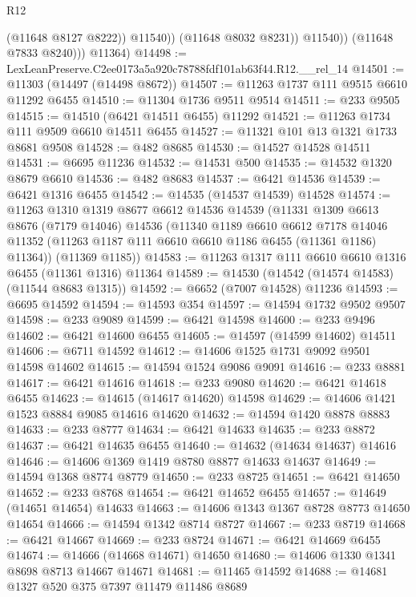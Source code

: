 \begin{lexlean}{R12}
\begin{coremodule}
                      (@11648 @8127 @8222))
                    @11540))
                (@11648 @8032 @8231))
              @11540))
          (@11648 @7833 @8240)))
      @11364)
@14498 := LexLeanPreserve.C2ee0173a5a920c78788fdf101ab63f44.R12.__rel_14
@14501 := @11303 (@14497 (@14498 @8672))
@14507 := @11263 @1737 @111 @9515 @6610 @11292 @6455
@14510 := @11304 @1736 @9511 @9514
@14511 := @233 @9505
@14515 := @14510 (@6421 @14511 @6455) @11292
@14521 := @11263 @1734 @111 @9509 @6610 @14511 @6455
@14527 := @11321 @101 @13 @1321 @1733 @8681 @9508
@14528 := @482 @8685
@14530 := @14527 @14528 @14511
@14531 := @6695 @11236
@14532 := @14531 @500
@14535 := @14532 @1320 @8679 @6610
@14536 := @482 @8683
@14537 := @6421 @14536
@14539 := @6421 @1316 @6455
@14542 := @14535 (@14537 @14539) @14528
@14574 := @11263
    @1310
    @1319
    @8677
    @6612
    @14536
    @14539
    (@11331
      @1309
      @6613
      @8676
      (@7179 @14046)
      @14536
      (@11340
        @1189
        @6610
        @6612
        @7178
        @14046
        @11352
        (@11263 @1187 @111 @6610 @6610 @1186 @6455 (@11361 @1186) @11364))
      (@11369 @1185))
@14583 := @11263 @1317 @111 @6610 @6610 @1316 @6455 (@11361 @1316) @11364
@14589 := @14530 (@14542 (@14574 @14583) (@11544 @8683 @1315))
@14592 := @6652 (@7007 @14528) @11236
@14593 := @6695 @14592
@14594 := @14593 @354
@14597 := @14594 @1732 @9502 @9507
@14598 := @233 @9089
@14599 := @6421 @14598
@14600 := @233 @9496
@14602 := @6421 @14600 @6455
@14605 := @14597 (@14599 @14602) @14511
@14606 := @6711 @14592
@14612 := @14606 @1525 @1731 @9092 @9501 @14598 @14602
@14615 := @14594 @1524 @9086 @9091
@14616 := @233 @8881
@14617 := @6421 @14616
@14618 := @233 @9080
@14620 := @6421 @14618 @6455
@14623 := @14615 (@14617 @14620) @14598
@14629 := @14606 @1421 @1523 @8884 @9085 @14616 @14620
@14632 := @14594 @1420 @8878 @8883
@14633 := @233 @8777
@14634 := @6421 @14633
@14635 := @233 @8872
@14637 := @6421 @14635 @6455
@14640 := @14632 (@14634 @14637) @14616
@14646 := @14606 @1369 @1419 @8780 @8877 @14633 @14637
@14649 := @14594 @1368 @8774 @8779
@14650 := @233 @8725
@14651 := @6421 @14650
@14652 := @233 @8768
@14654 := @6421 @14652 @6455
@14657 := @14649 (@14651 @14654) @14633
@14663 := @14606 @1343 @1367 @8728 @8773 @14650 @14654
@14666 := @14594 @1342 @8714 @8727
@14667 := @233 @8719
@14668 := @6421 @14667
@14669 := @233 @8724
@14671 := @6421 @14669 @6455
@14674 := @14666 (@14668 @14671) @14650
@14680 := @14606 @1330 @1341 @8698 @8713 @14667 @14671
@14681 := @11465 @14592
@14688 := @14681 @1327 @520 @375 @7397 @11479 @11486 @8689

\end{coremodule}
\end{lexlean}

